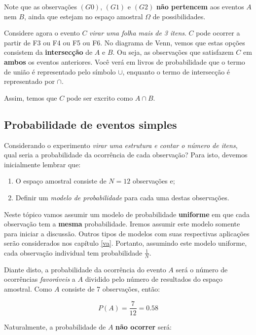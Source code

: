 \documentclass[
]{book}
\begin{document}
Note que as observações \((G0)\), \((G1)\) e \((G2)\) \textbf{não pertencem} aos eventos \(A\) nem \(B\), ainda que estejam no espaço amostral \(\Omega\) de possibilidades.

Considere agora o evento \(C\) \emph{virar uma folha mais de 3 itens}. \(C\) pode ocorrer a partir de F3 ou F4 ou F5 ou F6. No diagrama de Venn, vemos que estas opções consistem da \textbf{intersecção} de \(A\) e \(B\). Ou seja, as observações que satisfazem \(C\) em \textbf{ambos} os eventos anteriores. Você verá em livros de probabilidade que o termo de união é representado pelo símbolo \(\cup\), enquanto o termo de intersecção é representado por \(\cap\).

Assim, temos que \(C\) pode ser excrito como \(A \cap B\).

\hypertarget{probabilidade-de-eventos-simples}{%
\subsection{Probabilidade de eventos simples}\label{probabilidade-de-eventos-simples}}

Considerando o experimento \emph{virar uma estrutura e contar o número de itens}, qual seria a probabilidade da ocorrência de cada observação? Para isto, devemos inicialmente lembrar que:

\begin{enumerate}
\def\labelenumi{\arabic{enumi}.}
\item
  O espaço amostral consiste de \(N = 12\) observações e;
\item
  Definir um \emph{modelo de probabilidade} para cada uma destas observações.
\end{enumerate}

Neste tópico vamos assumir um modelo de probabilidade \textbf{uniforme} em que cada observação tem a \textbf{mesma} probabilidade. Iremos assumir este modelo somente para iniciar a discussão. Outros tipos de modelos com suas respectivas aplicações serão considerados nos capítulo \ref{va}. Portanto, assumindo este modelo uniforme, cada observação individual tem probabilidade \(\frac{1}{N}\).

Diante disto, a probabilidade da ocorrência do evento \(A\) será o número de ocorrências \emph{favoráveis} a \(A\) dividido pelo número de resultados do espaço amostral. Como \(A\) consiste de 7 observações, então:

\[P(A) = \frac{7}{12} = 0.58\]

Naturalmente, a probabilidade de \(A\) \textbf{não ocorrer} será:
\end{document}

